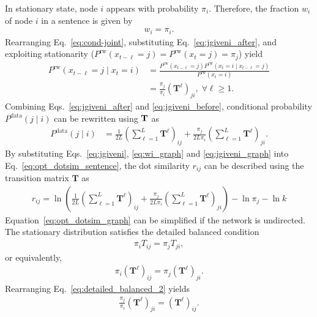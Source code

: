 \documentclass[12pt]{article} %
\def\given{\mid}
\def\mat#1{\mathbf{#1}}
\begin{document}
In stationary state, node $i$ appears with probability $\pi_i$. Therefore, the fraction $w_i$ of node $i$ in a sentence is given by
\begin{align}
    \label{eq:wi_graph}
    w_i = \pi_i.
\end{align}
Rearranging Eq.~\eqref{eq:cond-joint}, substituting Eq.~\eqref{eq:jgiveni_after}, and exploiting stationarity ($P^{\text{rw}}(x_{t-\ell} = j) = P^{\text{rw}}(x_{t} = j)=\pi_j$) yield
\begin{align}
    P^{\text{rw}}(x_{t-\ell}=j\given x_{t} = i) & = \frac{P^{\text{rw}}(x_{t-\ell} = j)P^{\text{rw}}(x_{t} = i \given x_{t-\ell}=j)}{P^{\text{rw}}(x_{t}=i)} \nonumber              \\
                                                & =\frac{\pi_j}{\pi_i}(\mat{T}^\ell)_{ji},\; \forall \ell\geq 1. \label{eq:jgiveni_before}
\end{align}
Combining Eqs.~\eqref{eq:jgiveni_after} and \eqref{eq:jgiveni_before}, conditional probability $P^{\text{data}}(j \given i)$ can be rewritten using ${\bf T}$ as
\begin{align}
    \label{eq:jgiveni_graph}
    P^{\text{data}}(j \given i) & = \frac{1}{2L}\left(\sum_{\ell=1}^L \mat{T}^\ell\right)_{ij} + \frac{\pi _j}{2L\pi _i}\left( \sum_{\ell=1}^L \mat{T}^\ell\right)_{ji}. %
\end{align}
By substituting Eqs.~\eqref{eq:jgiveni}, \eqref{eq:wi_graph} and \eqref{eq:jgiveni_graph} into Eq.~\eqref{eq:opt_dotsim_sentence}, the dot similarity $r_{ij}$ can be described using the transition matrix $\mat{T}$ as
\begin{align}
    \label{eq:opt_dotsim_graph}
    r_{ij} = \ln \left( \frac{1}{2L}\left(\sum_{\ell=1}^L \mat{T}^\ell\right)_{ij} + \frac{\pi _j}{2L\pi _i}\left( \sum_{\ell=1}^L \mat{T}^\ell\right)_{ji} \right) - \ln \pi_j -\ln k
\end{align}
Equation~\eqref{eq:opt_dotsim_graph} can be simplified if the network is undirected.
The stationary distribution satisfies the detailed balanced condition
\begin{align}
    \label{eq:detailed_balanced}
    \pi_i T_{ij} = \pi_j T_{ji},
\end{align}
or equivalently,
\begin{align}
    \label{eq:detailed_balanced_2}
    \pi_i (\mat{T}^\ell)_{ij} = \pi_j (\mat{T}^\ell)_{ji}.
\end{align}
Rearranging Eq.~\eqref{eq:detailed_balanced_2} yields
\begin{align}
    \label{eq:detailed_balanced_3}
    \frac{\pi_j}{\pi_i} (\mat{T}^\ell)_{ji}  = (\mat{T}^\ell)_{ij} .
\end{align}
\end{document}
